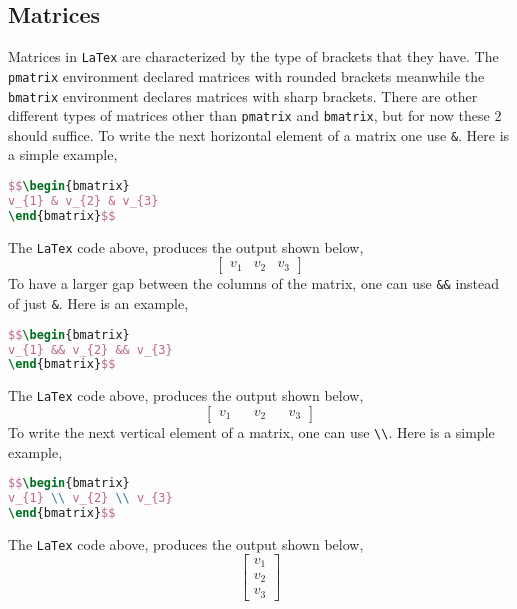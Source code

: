 \documentclass[a4paper, 12pt]{report}
\begin{document}
\begin{center}
\subsection{Matrices}
\begin{comment}
\end{comment}
Matrices in \texttt{LaTex} are characterized by the type of brackets that they have. The \texttt{pmatrix} environment declared matrices with rounded brackets meanwhile the \texttt{bmatrix} environment declares matrices with sharp brackets. There are other different types of matrices other than \texttt{pmatrix} and \texttt{bmatrix}, but for now these $2$ should suffice. To write the next horizontal element of a matrix one use \texttt{\&}. Here is a simple example,
\begin{lstlisting}[language=tex]
$$\begin{bmatrix}
v_{1} & v_{2} & v_{3}
\end{bmatrix}$$
\end{lstlisting}
The \texttt{LaTex} code above, produces the output shown below,
$$\begin{bmatrix}
v_{1} & v_{2} & v_{3}
\end{bmatrix}$$
To have a larger gap between the columns of the matrix, one can use \texttt{\&\&} instead of just \texttt{\&}. Here is an example,
\begin{lstlisting}[language=tex]
$$\begin{bmatrix}
v_{1} && v_{2} && v_{3}
\end{bmatrix}$$
\end{lstlisting}
The \texttt{LaTex} code above, produces the output shown below,
$$\begin{bmatrix}
v_{1} && v_{2} && v_{3}
\end{bmatrix}$$
To write the next vertical element of a matrix, one can use \texttt{\textbackslash \textbackslash}. Here is a simple example,
\begin{lstlisting}[language=tex]
$$\begin{bmatrix}
v_{1} \\ v_{2} \\ v_{3}
\end{bmatrix}$$
\end{lstlisting}
The \texttt{LaTex} code above, produces the output shown below,
$$\begin{bmatrix}
v_{1} \\ v_{2} \\ v_{3}
\end{bmatrix}$$

\end{center}
\end{document}
